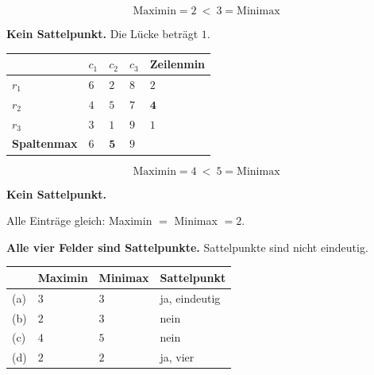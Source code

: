 \begin{aufgabe}
\[ \text{Maximin} = 2 \ <\ 3 = \text{Minimax} \]

\textcolor{akzent}{\textbf{Kein Sattelpunkt.}} Die Lücke beträgt $1$.

\begin{center}
\renewcommand{\arraystretch}{1.46}
\begin{tabular}{@{}P{2.2cm}P{1.0cm}P{1.0cm}P{1.0cm}P{1.9cm}@{}}
\toprule
& $c_1$ & $c_2$ & $c_3$ & \textbf{Zeilenmin}\\
\midrule
$r_1$ & $6$ & $2$ & $8$ & $2$\\
$r_2$ & $4$ & $5$ & $7$ & $\mathbf{4}$\\
$r_3$ & $3$ & $1$ & $9$ & $1$\\
\midrule
\textbf{Spaltenmax} & $6$ & $\mathbf{5}$ & $9$ & \\
\bottomrule
\end{tabular}
\end{center}

\[ \text{Maximin} = 4 \ <\ 5 = \text{Minimax} \]

\textcolor{akzent}{\textbf{Kein Sattelpunkt.}}

Alle Einträge gleich: Maximin $=$ Minimax $= 2$.

\begin{center}
\begin{minipage}{0.9\textwidth}
\textbf{Alle vier Felder sind Sattelpunkte.} Sattelpunkte sind nicht eindeutig.
\end{minipage}
\end{center}

\begin{center}
{\small
\renewcommand{\arraystretch}{1.48}
\begin{tabular}{@{}P{1.0cm}P{1.8cm}P{1.8cm}P{2.2cm}@{}}
\toprule
& \textbf{Maximin} & \textbf{Minimax} & \textbf{Sattelpunkt}\\
\midrule
(a) & $3$ & $3$ & \textcolor{gruen}{ja, eindeutig}\\
(b) & $2$ & $3$ & \textcolor{akzent}{nein}\\
(c) & $4$ & $5$ & \textcolor{akzent}{nein}\\
(d) & $2$ & $2$ & \textcolor{gruen}{ja, vier}\\
\bottomrule
\end{tabular}}
\end{center}

\begin{center}
\begin{minipage}{0.88\textwidth}
\end{minipage}
\end{center}
\end{aufgabe}


